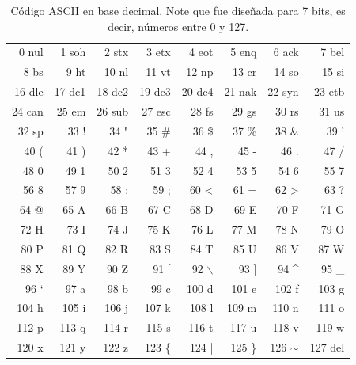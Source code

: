 \documentclass[12pt]{article}
\begin{document}
\begin{table}[ht]
\centering
\caption{Código ASCII en base decimal. Note que fue diseñada para 7 bits,
es decir, números entre 0 y 127.}
\small
\begin{tabular}{rrrrrrrr}
\toprule
0  nul & 1  soh & 2  stx & 3  etx & 4  eot & 5  enq & 6  ack & 7  bel \\
8  bs  & 9  ht  & 10 nl  & 11 vt  & 12 np  & 13 cr  & 14 so  & 15 si  \\
16 dle & 17 dc1 & 18 dc2 & 19 dc3 & 20 dc4 & 21 nak & 22 syn & 23 etb \\
24 can & 25 em  & 26 sub & 27 esc & 28 fs  & 29 gs  & 30 rs  & 31 us  \\
32 sp  & 33 !   & 34 "   & 35 \#  & 36 \$  & 37 \%  & 38 \&  & 39 '   \\
40 (   & 41 )   & 42 *   & 43 +   & 44 ,   & 45 -   & 46 .   & 47 /   \\
48 0   & 49 1   & 50 2   & 51 3   & 52 4   & 53 5   & 54 6   & 55 7   \\
56 8   & 57 9   & 58 :   & 59 ;   & 60 <   & 61 =   & 62 >   & 63 ?   \\
64 @   & 65 A   & 66 B   & 67 C   & 68 D   & 69 E   & 70 F   & 71 G   \\
72 H   & 73 I   & 74 J   & 75 K   & 76 L   & 77 M   & 78 N   & 79 O   \\
80 P   & 81 Q   & 82 R   & 83 S   & 84 T   & 85 U   & 86 V   & 87 W   \\
88 X   & 89 Y   & 90 Z   & 91 [   & 92 $\backslash$ & 93 ] & 94 \^{} & 95 \_ \\
96 `   & 97 a   & 98 b   & 99 c   & 100 d  & 101 e  & 102 f  & 103 g  \\
104 h  & 105 i  & 106 j  & 107 k  & 108 l  & 109 m  & 110 n  & 111 o  \\
112 p  & 113 q  & 114 r  & 115 s  & 116 t  & 117 u  & 118 v  & 119 w  \\
120 x  & 121 y  & 122 z  & 123 \{ & 124 |  & 125 \} & 126 $\sim$ & 127 del \\
\bottomrule
\end{tabular}
\end{table}
\end{document}
